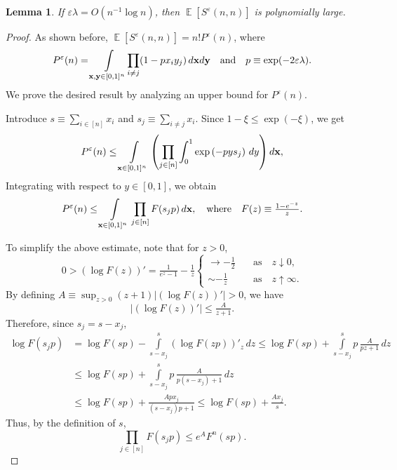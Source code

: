 \documentclass[11pt]{amsart}
\newtheorem{lemma}[theorem]{Lemma}
\newcommand{\E}{\operatorname{\mathbb{E}}}
\def\eps{\varepsilon}
\theoremstyle{remark}
\numberwithin{equation}{section}
\begin{document}
\begin{lemma}\label{lem1} If $\eps \lambda =O(n^{-1}\log n)$, then $\E[S^{\eps}(n,n)]$ is polynomially large.
\end{lemma}
\begin{proof} As shown before,  $\E[S^{\eps}(n,n)]=n! P^{\eps}(n)$, where
\begin{equation*}
    P^{\eps}(n) = \int\limits_{\bold x,\bold y\in [0,1]^n}\!\prod_{i\neq j}(1-px_iy_j)\,d\bold x d\bold y \quad \text{and} \quad p \equiv \exp(-2\eps\lambda).
\end{equation*}
We prove the desired result by analyzing an upper bound for $P^{\eps}(n)$. 


Introduce $s\equiv \sum_{i\in [n]}x_i$ and $s_j \equiv \sum_{i\neq j}x_i$. Since $1-\xi \leq \exp(-\xi)$, we get
\begin{equation}\label{9}
P^{\eps}(n)\leq \int\limits_{\bold x\in [0,1]^n}\left(\prod_{j\in [n]}\int_0^1\exp\left(-pys_j\right)\,dy\right)
d\bold x,
\end{equation}
Integrating with respect to $y\in [0,1]$, we obtain 
\begin{equation}\label{9.1}
 P^{\eps}(n) \leq \int\limits_{\bold x\in [0,1]^n}\prod_{j\in [n]}F(s_j p)\,d\bold x, \quad \text{where} \quad F(z) \equiv \tfrac{1-e^{-z}}{z}.   
\end{equation}

To simplify the above estimate, note that for  $z>0$,
\begin{equation*}
0>\left(\log F(z)\right)'=\tfrac{1}{e^z-1}-\tfrac{1}{z}\begin{cases}
\to -\tfrac{1}{2} \quad &\text{as} \quad z\downarrow 0,\\
\sim -\tfrac{1}{z} \quad &\text{as} \quad z\uparrow\infty.
\end{cases}
\end{equation*}
By defining $A \equiv \sup_{z>0}(z+1)\left|\left(\log F(z)\right)'\right|>0$, we have
\begin{equation*}
\Big|(\log F(z))'\Bigr|\le \tfrac{A}{z+1}.
\end{equation*}
Therefore, since $s_j=s-x_j$,
\begin{align*}
\log F(s_jp)
&=\log F(sp)-\int\limits_{s-x_j}^s(\log F(zp))'_z\,dz \leq \log F(sp)+\int\limits_{s-x_j}^s p\, \frac{A}{pz+1}\,dz\\
&\leq \log F(sp)+\int\limits_{s-x_j}^s p\, \frac{A}{p(s-x_j)+1}\,dz\\
& \leq \log F(sp)+\frac{Apx_j}{(s-x_j)p+1}\le \log F(sp)+\frac{Ax_j}{s}.
\end{align*}
Thus, by the definition of $s$,
\begin{equation*}
\prod_{j\in [n]}F(s_jp)\le e^A F^n(sp).    
\end{equation*}


\end{proof}
\end{document}
